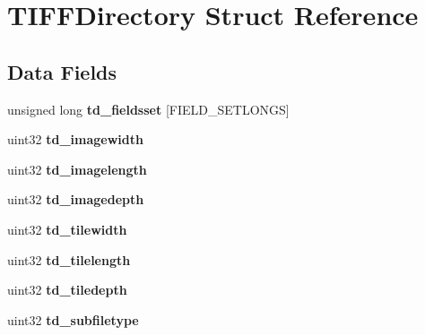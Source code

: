 \hypertarget{struct_t_i_f_f_directory}{}\section{T\+I\+F\+F\+Directory Struct Reference}
\label{struct_t_i_f_f_directory}
\subsection*{Data Fields}
\begin{DoxyCompactItemize}
\item 
\hypertarget{struct_t_i_f_f_directory_a57a74768cfa9dca91fa8a2c1658cf293}{}unsigned long {\bfseries td\+\_\+fieldsset} \mbox{[}F\+I\+E\+L\+D\+\_\+\+S\+E\+T\+L\+O\+N\+G\+S\mbox{]}\label{struct_t_i_f_f_directory_a57a74768cfa9dca91fa8a2c1658cf293}

\item 
\hypertarget{struct_t_i_f_f_directory_a0e3cb5f0ef64529278bf53c8feb680ad}{}uint32 {\bfseries td\+\_\+imagewidth}\label{struct_t_i_f_f_directory_a0e3cb5f0ef64529278bf53c8feb680ad}

\item 
\hypertarget{struct_t_i_f_f_directory_a5f39662ddbebc4cacb69753dffc1b2e9}{}uint32 {\bfseries td\+\_\+imagelength}\label{struct_t_i_f_f_directory_a5f39662ddbebc4cacb69753dffc1b2e9}

\item 
\hypertarget{struct_t_i_f_f_directory_ae8a7658a8ce0b1041aec5d944515afb8}{}uint32 {\bfseries td\+\_\+imagedepth}\label{struct_t_i_f_f_directory_ae8a7658a8ce0b1041aec5d944515afb8}

\item 
\hypertarget{struct_t_i_f_f_directory_a4e673779f2778dd7a6a1d3c9a9e99c15}{}uint32 {\bfseries td\+\_\+tilewidth}\label{struct_t_i_f_f_directory_a4e673779f2778dd7a6a1d3c9a9e99c15}

\item 
\hypertarget{struct_t_i_f_f_directory_ae705e646e7a5fd3ac81255d3dde3a842}{}uint32 {\bfseries td\+\_\+tilelength}\label{struct_t_i_f_f_directory_ae705e646e7a5fd3ac81255d3dde3a842}

\item 
\hypertarget{struct_t_i_f_f_directory_a4a97480e99b2808f548b140beb20cad3}{}uint32 {\bfseries td\+\_\+tiledepth}\label{struct_t_i_f_f_directory_a4a97480e99b2808f548b140beb20cad3}

\item 
\hypertarget{struct_t_i_f_f_directory_ac9b5ea013ffd02596f96fd1edb6fc459}{}uint32 {\bfseries td\+\_\+subfiletype}\label{struct_t_i_f_f_directory_ac9b5ea013ffd02596f96fd1edb6fc459}


\end{DoxyCompactItemize}
